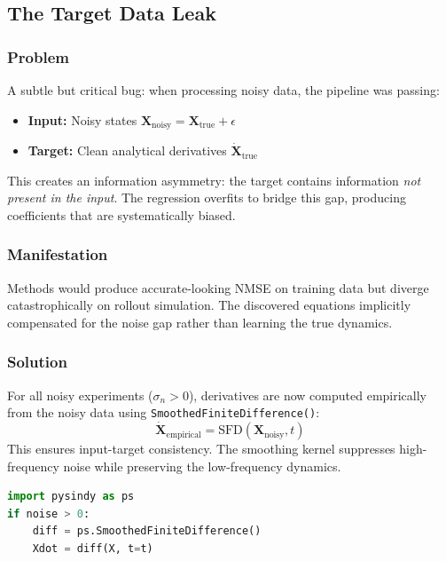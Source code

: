 \documentclass[conference]{IEEEtran}
\begin{document}
\subsection{The Target Data Leak}
\label{sec:dataleak}

\subsubsection{Problem}
A subtle but critical bug: when processing noisy data, the pipeline was passing:
\begin{itemize}
    \item \textbf{Input:} Noisy states $\mathbf{X}_\text{noisy} = \mathbf{X}_\text{true} + \epsilon$
    \item \textbf{Target:} Clean analytical derivatives $\dot{\mathbf{X}}_\text{true}$
\end{itemize}
This creates an information asymmetry: the target contains information \textit{not present in the input}. The regression overfits to bridge this gap, producing coefficients that are systematically biased.

\subsubsection{Manifestation}
Methods would produce accurate-looking NMSE on training data but diverge catastrophically on rollout simulation. The discovered equations implicitly compensated for the noise gap rather than learning the true dynamics.

\subsubsection{Solution}
For all noisy experiments ($\sigma_n > 0$), derivatives are now computed empirically from the noisy data using \texttt{SmoothedFiniteDifference()}:
\begin{equation}
\dot{\mathbf{X}}_\text{empirical} = \text{SFD}(\mathbf{X}_\text{noisy}, t)
\end{equation}
This ensures input-target consistency. The smoothing kernel suppresses high-frequency noise while preserving the low-frequency dynamics.

\begin{lstlisting}[language=Python, caption={Noise-aware derivative computation}]
import pysindy as ps
if noise > 0:
    diff = ps.SmoothedFiniteDifference()
    Xdot = diff(X, t=t)
\end{lstlisting}
\end{document}
